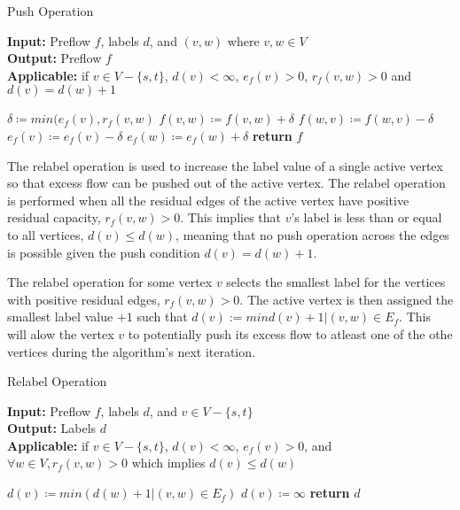 \begin{algorithm}
	\caption{Push Operation}\label{alg:push}
	\textbf{Input:} Preflow $f$, labels $d$, and $(v,w)$ where $v,w \in V$\\
	\textbf{Output:} Preflow $f$\\
	\textbf{Applicable:} if $v \in V-\{s,t\}$, $d(v) < \infty$, $e_f(v)>0$, $r_f(v,w)>0$ and $d(v)=d(w)+1$
	\begin{algorithmic}[1]
		\State $\delta \coloneqq min(e_f(v), r_f(v,w)$
		\State $f(v,w) \coloneqq f(v,w) + \delta$
		\State $f(w,v) \coloneqq f(w,v) - \delta$
		\State $e_f(v) \coloneqq e_f(v) - \delta$
		\State $e_f(w) \coloneqq e_f(w) + \delta$
		\State \textbf{return} $f$
		\EndProcedure
	\end{algorithmic}
\end{algorithm}
	
\begin{definition}
	The relabel operation is used to increase the label value of a single active vertex so that excess flow can be pushed out of the active vertex. The relabel operation is performed when all the residual edges of the active vertex have positive residual capacity, $r_f(v,w)>0$. This implies that $v$'s label is less than or equal to all vertices, $d(v) \leq d(w)$, meaning that no push operation across the edges is possible given the push condition $d(v) = d(w)+1$.
\end{definition}
The relabel operation for some vertex $v$ selects the smallest label for the vertices with positive residual edges, $r_f(v,w)>0$. The active vertex is then assigned the smallest label value $+1$ such that $d(v) := min{d(v)+1 | (v,w) \in E_f}$. This will alow the vertex $v$ to potentially push its excess flow to atleast one of the othe vertices during the algorithm's next iteration.

\begin{algorithm}
	\caption{Relabel Operation}\label{alg:relabel}
	\textbf{Input:} Preflow $f$, labels $d$, and $v \in V-\{s,t\}$\\
	\textbf{Output:} Labels $d$\\
	\textbf{Applicable:} if $v \in V-\{s,t\}$, $d(v) < \infty$, $e_f(v)>0$, and $\forall w \in V, r_f(v,w)>0$ which implies $d(v) \leq d(w)$
	\begin{algorithmic}[1]
		\State $d(v) \coloneqq min(d(w)+1 | (v,w) \in E_f)$
		\Else 
		\State $d(v) \coloneqq \infty$
		\EndIf
		\State \textbf{return} $d$
		\EndProcedure
	\end{algorithmic}
\end{algorithm}

